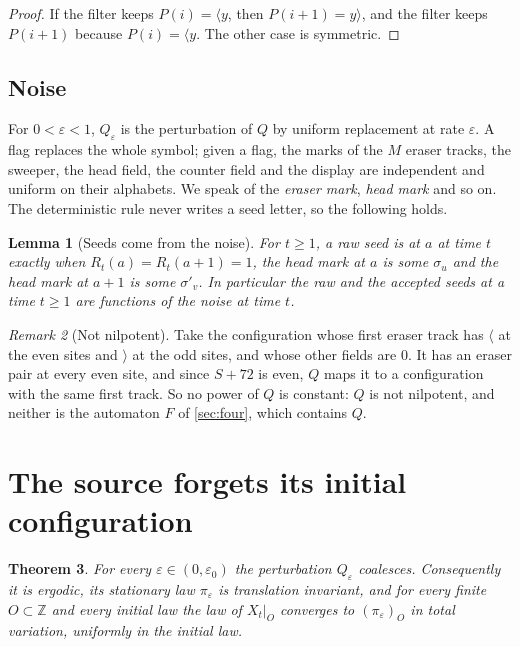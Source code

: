\documentclass[11pt]{article}
\theoremstyle{plain}
\newtheorem{theorem}{Theorem}[section]
\newtheorem{lemma}[theorem]{Lemma}
\theoremstyle{definition}
\theoremstyle{remark}
\newtheorem{remark}[theorem]{Remark}
\newcommand{\Z}{\mathbb Z}
\newcommand{\eps}{\varepsilon}
\newcommand{\Lh}[1]{\langle #1}
\newcommand{\Rh}[1]{#1\rangle}
\begin{document}
\begin{proof}
If the filter keeps $P(i)=\Lh y$, then $P(i+1)=\Rh y$, and the filter keeps $P(i+1)$ because $P(i)=\Lh y$. The other case is symmetric.
\end{proof}

\subsection{Noise}

For $0<\eps<1$, $Q_\eps$ is the perturbation of $Q$ by uniform replacement at rate $\eps$. A flag replaces the whole symbol; given a flag, the marks of the $M$ eraser tracks, the sweeper, the head field, the counter field and the display are independent and uniform on their alphabets. We speak of the \emph{eraser mark}, \emph{head mark} and so on. The deterministic rule never writes a seed letter, so the following holds.

\begin{lemma}[Seeds come from the noise]\label{lem:fresh}
For $t\ge1$, a raw seed is at $a$ at time $t$ exactly when $R_t(a)=R_t(a+1)=1$, the head mark at $a$ is some $\sigma_u$ and the head mark at $a+1$ is some $\sigma'_v$. In particular the raw and the accepted seeds at a time $t\ge1$ are functions of the noise at time $t$.
\end{lemma}

\begin{remark}[Not nilpotent]\label{rem:not-nilpotent}
Take the configuration whose first eraser track has $\langle$ at the even sites and $\rangle$ at the odd sites, and whose other fields are $0$. It has an eraser pair at every even site, and since $S+72$ is even, $Q$ maps it to a configuration with the same first track. So no power of $Q$ is constant: $Q$ is not nilpotent, and neither is the automaton $F$ of \cref{sec:four}, which contains $Q$.
\end{remark}

\section{The source forgets its initial configuration}\label{sec:source-ergodic}

\begin{theorem}\label{thm:source-ergodic}
For every $\eps\in(0,\eps_0)$ the perturbation $Q_\eps$ coalesces. Consequently it is ergodic, its stationary law $\pi_\eps$ is translation invariant, and for every finite $O\subset\Z$ and every initial law the law of $X_t|_O$ converges to $(\pi_\eps)_O$ in total variation, uniformly in the initial law.
\end{theorem}
\end{document}
